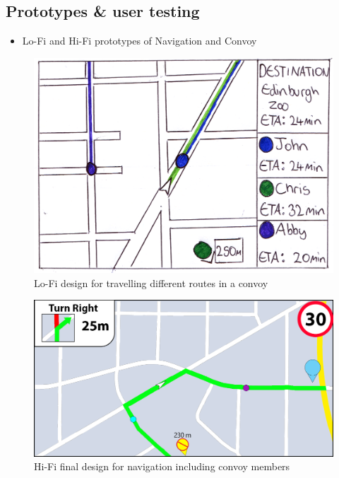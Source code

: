 \documentclass{article}
\begin{document}
\subsection{Prototypes \& user testing}\label{ssec:nav-prototypes-testing}
\begin{itemize}
  \item Lo-Fi and Hi-Fi prototypes of Navigation and Convoy
\end{itemize}
\begin{figure}[H]
  \centering
  \includegraphics[scale=0.5]{convoy-lofi}
  \caption{Lo-Fi design for travelling different routes in a convoy}\label{prototype-lofi-convoy}
\end{figure}

\begin{figure}[H]
  \centering
  \includegraphics[scale=0.3]{convoy-map}
  \caption{Hi-Fi final design for navigation including convoy members}\label{prototype-lofi-convoy}
\end{figure}
\end{document}

